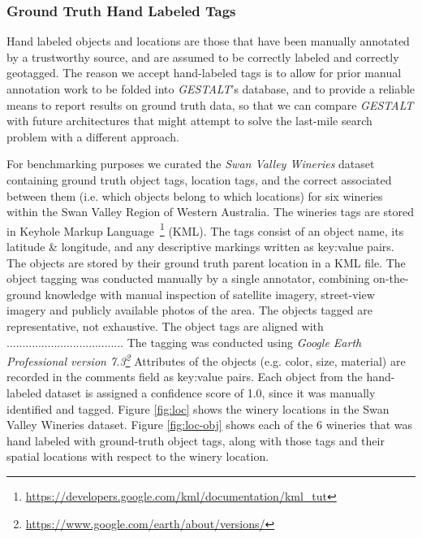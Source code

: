 \subsubsection{Ground Truth Hand Labeled Tags} 
Hand labeled objects and locations are those that have been manually annotated by a trustworthy source, and are assumed to be correctly labeled and correctly geotagged. 
The reason we accept hand-labeled tags is to allow for prior manual annotation work to be folded into \emph{GESTALT}'s database, and to provide a reliable means to report results on ground truth data, so that we can compare \emph{GESTALT} with future architectures that might attempt to solve the last-mile search problem with a different approach. 

For benchmarking purposes we curated the \emph{Swan Valley Wineries} dataset containing ground truth object tags, location tags, and the correct associated between them (i.e. which objects belong to which locations) for six wineries within the Swan Valley Region of Western Australia.
The wineries tags are stored in Keyhole Markup Language~\footnote{\href{https://developers.google.com/kml/documentation/kml\_tut}{https://developers.google.com/kml/documentation/kml\_tut}} (KML).
The tags consist of an object name, its latitude \& longitude, and any descriptive markings written as key:value pairs. The objects are stored by their ground truth parent location in a KML file.
The object tagging was conducted manually by a single annotator, combining on-the-ground knowledge with manual inspection of satellite imagery, street-view imagery and publicly available photos of the area. 
The objects tagged are representative, not exhaustive. 
The object tags are aligned with ..................................... 
The tagging was conducted using \textit{Google Earth Professional version 7.3\footnote{\href{https://www.google.com/earth/about/versions/}{https://www.google.com/earth/about/versions/}}}
Attributes of the objects (e.g. color, size, material) are recorded in the comments field as key:value pairs.
Each object from the hand-labeled dataset is assigned a confidence score of 1.0, since it was manually identified and tagged.
Figure \ref{fig:loc} shows the winery locations in the Swan Valley Wineries dataset. 
Figure \ref{fig:loc-obj} shows each of the 6 wineries that was hand labeled with ground-truth object tags, along with those tags and their spatial locations with respect to the winery location.




